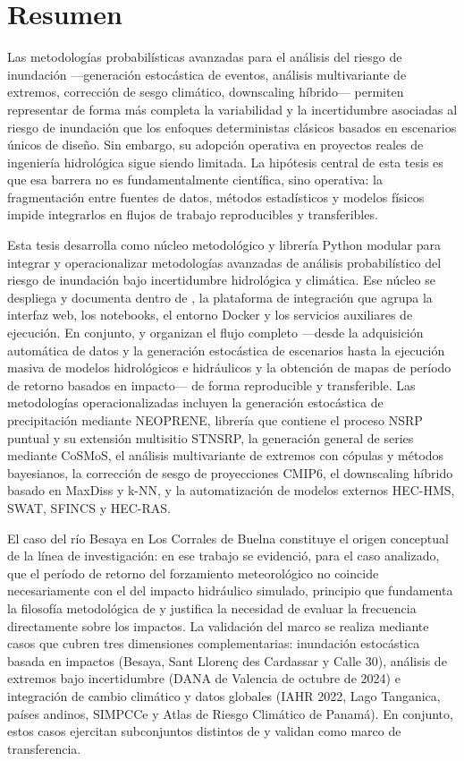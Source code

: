 \chapter*{Resumen}

Las metodologías probabilísticas avanzadas para el análisis del riesgo de inundación ---generación estocástica de eventos, análisis multivariante de extremos, corrección de sesgo climático, downscaling híbrido--- permiten representar de forma más completa la variabilidad y la incertidumbre asociadas al riesgo de inundación que los enfoques deterministas clásicos basados en escenarios únicos de diseño. Sin embargo, su adopción operativa en proyectos reales de ingeniería hidrológica sigue siendo limitada. La hipótesis central de esta tesis es que esa barrera no es fundamentalmente científica, sino operativa: la fragmentación entre fuentes de datos, métodos estadísticos y modelos físicos impide integrarlos en flujos de trabajo reproducibles y transferibles.

Esta tesis desarrolla \pyhydra como núcleo metodológico y librería Python modular para integrar y operacionalizar metodologías avanzadas de análisis probabilístico del riesgo de inundación bajo incertidumbre hidrológica y climática. Ese núcleo se despliega y documenta dentro de \hydra, la plataforma de integración que agrupa la interfaz web, los notebooks, el entorno Docker y los servicios auxiliares de ejecución. En conjunto, \pyhydra y \hydra organizan el flujo completo ---desde la adquisición automática de datos y la generación estocástica de escenarios hasta la ejecución masiva de modelos hidrológicos e hidráulicos y la obtención de mapas de período de retorno basados en impacto--- de forma reproducible y transferible. Las metodologías operacionalizadas incluyen la generación estocástica de precipitación mediante NEOPRENE, librería que contiene el proceso NSRP puntual y su extensión multisitio STNSRP, la generación general de series mediante CoSMoS, el análisis multivariante de extremos con cópulas y métodos bayesianos, la corrección de sesgo de proyecciones CMIP6, el downscaling híbrido basado en MaxDiss y k-NN, y la automatización de modelos externos HEC-HMS, SWAT, SFINCS y HEC-RAS.

El caso del río Besaya en Los Corrales de Buelna constituye el origen conceptual de la línea de investigación: en ese trabajo se evidenció, para el caso analizado, que el período de retorno del forzamiento meteorológico no coincide necesariamente con el del impacto hidráulico simulado, principio que fundamenta la filosofía metodológica de \hydra y justifica la necesidad de evaluar la frecuencia directamente sobre los impactos. La validación del marco se realiza mediante casos que cubren tres dimensiones complementarias: inundación estocástica basada en impactos (Besaya, Sant Llorenç des Cardassar y Calle 30), análisis de extremos bajo incertidumbre (DANA de Valencia de octubre de 2024) e integración de cambio climático y datos globales (IAHR 2022, Lago Tanganica, países andinos, SIMPCCe y Atlas de Riesgo Climático de Panamá). En conjunto, estos casos ejercitan subconjuntos distintos de \pyhydra y validan \hydra como marco de transferencia.

